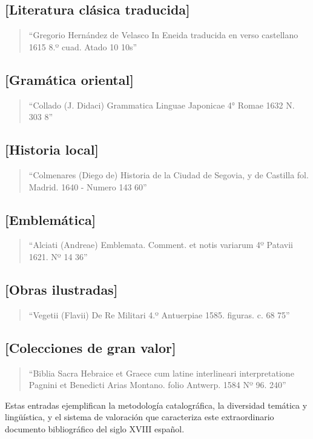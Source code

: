 \documentclass[12pt,a4paper]{article}
\begin{document}
\subsection*{[Literatura clásica traducida]}
\begin{quote}
``Gregorio Hernández de Velasco In Eneida traducida en verso castellano 1615 8.º cuad. Atado 10 10s''
\end{quote}

\subsection*{[Gramática oriental]}
\begin{quote}
``Collado (J. Didaci) Grammatica Linguae Japonicae 4° Romae 1632 N. 303 8''
\end{quote}

\subsection*{[Historia local]}
\begin{quote}
``Colmenares (Diego de) Historia de la Ciudad de Segovia, y de Castilla fol. Madrid. 1640 - Numero 143 60''
\end{quote}

\subsection*{[Emblemática]}
\begin{quote}
``Alciati (Andreae) Emblemata. Comment. et notis variarum 4º Patavii 1621. Nº 14 36''
\end{quote}

\subsection*{[Obras ilustradas]}
\begin{quote}
``Vegetii (Flavii) De Re Militari 4.º Antuerpiae 1585. figuras. c. 68 75''
\end{quote}

\subsection*{[Colecciones de gran valor]}
\begin{quote}
``Biblia Sacra Hebraice et Graece cum latine interlineari interpretatione Pagnini et Benedicti Arias Montano. folio Antwerp. 1584 Nº 96. 240''
\end{quote}

\vspace{1em}
Estas entradas ejemplifican la metodología catalográfica, la diversidad temática y lingüística, y el sistema de valoración que caracteriza este extraordinario documento bibliográfico del siglo XVIII español.
\end{document}

